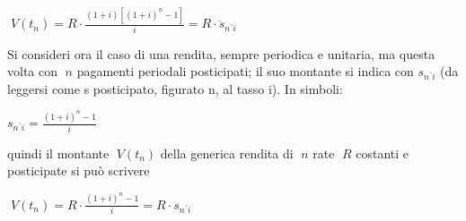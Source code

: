 $\; V(t_n) = R\cdot\frac{(1+i)[(1+i)^{n}-1]}{i} = R\cdot\ddot{s}_{n^\urcorner 
i}$

Si consideri ora il caso di una rendita, sempre periodica e unitaria, ma questa 
volta con $\;n$ pagamenti periodali posticipati; il suo montante si indica con 
$s_{n^\urcorner i}$ (da leggersi come s posticipato, figurato n, al tasso i). 
In simboli:

$s_{n^\urcorner i} = \frac{(1+i)^{n}-1}{i}$

quindi il montante $\;V(t_n)$ della generica rendita di $\;n$ rate $\;R$ 
costanti e posticipate si può scrivere

$\; V(t_n)= R\cdot\frac{(1+i)^{n}-1}{i}= R\cdot s_{n^\urcorner i}$



